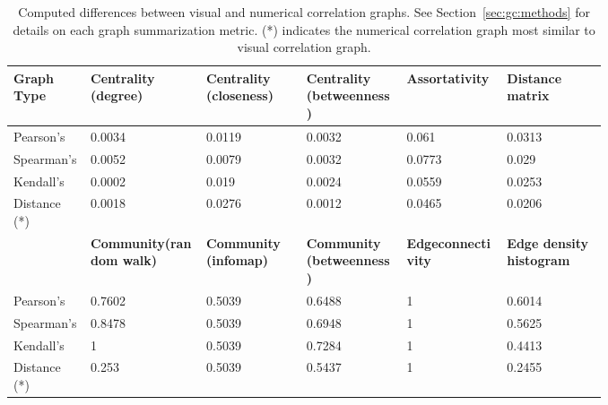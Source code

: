 \begin{landscape}
	\tablespacing
	\begin{longtable}{p{0.1\linewidth}p{0.15\linewidth}p{0.13\linewidth}
			p{0.13\linewidth}p{0.13\linewidth}p{0.13\linewidth} }
		
		\caption[Computed differences between visual and numerical correlation 
		graphs.]{Computed differences between visual and numerical correlation 
		graphs. See Section~\ref{sec:gc:methods} for details on each graph 
		summarization metric. (*) indicates the numerical correlation graph 
		most similar to visual correlation graph.} 
		\label{tab:usage:graphdiff}\\
		\toprule
		\textbf{Graph Type} & \textbf{Centrality \newline (degree)} & 
		\textbf{Centrality \newline (closeness)} & 
		\textbf{Centrality \newline (betweenness)} & 
		\textbf{Assortativity} & \textbf{Distance \newline matrix} \\
		\midrule
		\endfirsthead
		
		\bottomrule
		\endlastfoot

		Pearson's & 0.0034 & 0.0119 & 0.0032 & 0.061 & 0.0313\\
		
		Spearman's & 0.0052 & 0.0079 & 0.0032 & 0.0773 & 0.029\\
		
		Kendall's & 0.0002 & 0.019 & 0.0024 & 0.0559 & 0.0253\\
		
		Distance (*) & 0.0018 & 0.0276 & 0.0012 & 0.0465 & 0.0206\\
		
		\midrule
		
		& \textbf{Community\newline (random walk)} & 
		\textbf{Community \newline (infomap)} & 
		\textbf{Community \newline (betweenness)} & 
		\textbf{Edge\newline connectivity} & 
		\textbf{Edge density \newline histogram} \\
		 	
		\midrule
		
		Pearson's & 0.7602 & 0.5039 & 0.6488 & 1 & 0.6014\\
		
		Spearman's & 0.8478 & 0.5039 & 0.6948 & 1 & 0.5625\\
		
		Kendall's & 1 & 0.5039 & 0.7284 & 1 & 0.4413\\
		
		Distance (*) & 0.253 & 0.5039 & 0.5437 & 1 & 0.2455\\
		
	\end{longtable}
	\bodyspacing
\end{landscape}





